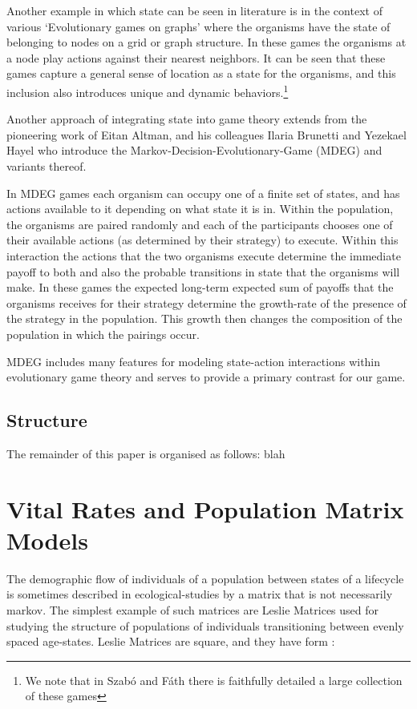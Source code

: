 Another example in which state can be seen in literature is in the context of various `Evolutionary games on graphs' where the organisms have the state of belonging to nodes on a grid or graph structure. In these games the organisms at a node play actions against their nearest neighbors. It can be seen that these games capture a general sense of location as a state for the organisms, and this inclusion also introduces unique and dynamic behaviors.\cite{spacial1,nowak,spacial2,spacial3}\footnote{We note that in Szabó and Fáth\cite{spacial4} there is faithfully detailed a large collection of these games}

Another approach of integrating state into game theory extends from the pioneering work of Eitan Altman, and his colleagues Ilaria Brunetti and Yezekael Hayel \cite{markov2,markov3,markov4,markov5,markov8,markov9} who introduce the Markov-Decision-Evolutionary-Game (MDEG) and variants thereof.

In MDEG games each organism can occupy one of a finite set of states, and has actions available to it depending on what state it is in.
Within the population, the organisms are paired randomly and each of the participants chooses one of their available actions (as determined by their strategy) to execute.
Within this interaction the actions that the two organisms execute determine the immediate payoff to both and also the probable transitions in state that the organisms will make.
In these games the expected long-term expected sum of payoffs that the organisms receives for their strategy determine the growth-rate of the presence of the strategy in the population.
This growth then changes the composition of the population in which the pairings occur.

MDEG includes many features for modeling state-action interactions within evolutionary game theory and serves to provide a primary contrast for our game.


\subsection{Structure}
The remainder of this paper is organised as follows: blah


\section{Vital Rates and Population Matrix Models}\label{sec:2}

The demographic flow of individuals of a population between states of a lifecycle is sometimes described in ecological-studies by a matrix that is not necessarily markov.
The simplest example of such matrices are Leslie Matrices used for studying the structure of populations of individuals transitioning between evenly spaced age-states.
Leslie Matrices are square, and they have form \cite{leslie}:

